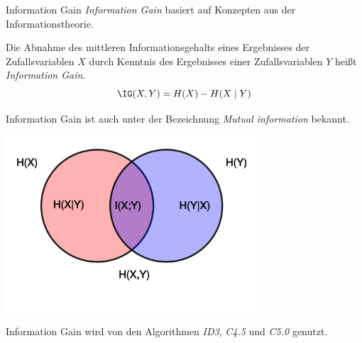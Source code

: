 \begin{defi}{Information Gain}
    \emph{Information Gain} basiert auf Konzepten aus der Informationstheorie.

    Die Abnahme des mittleren Informationsgehalts eines Ergebnisses der Zufallsvariablen $X$ durch Kenntnis des Ergebnisses einer Zufallsvariablen $Y$ heißt \emph{Information Gain}.
    \[
        \IG(X, Y) = H(X) - H(X \mid Y)
    \]

    Information Gain ist auch unter der Bezeichnung \emph{Mutual information} bekannt.

    \begin{center}
        \includegraphics[width=0.7\textwidth]{includes/figures/defi_information_gain.png}
    \end{center}

    Information Gain wird von den Algorithmen \emph{ID3}, \emph{C4.5} und \emph{C5.0} genutzt.
\end{defi}

